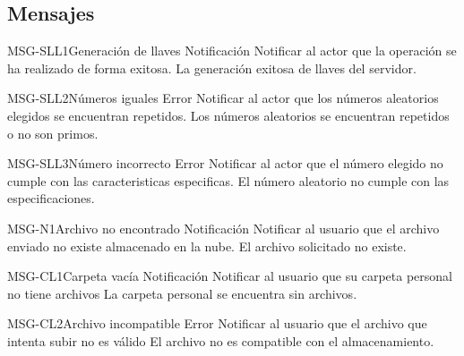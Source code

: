 \subsection{Mensajes}

\begin{Message}{MSG-SLL1}{Generación de llaves} 
	\MSGitem[Tipo: ] Notificación
	\MSGitem[Objetivo: ] Notificar al actor que la operación se ha realizado de forma exitosa.
	\MSGitem[Redacción: ] La generación exitosa de llaves del servidor.
	\MSGitem[Ejemplo: ] 
\end{Message}

\begin{Message}{MSG-SLL2}{Números iguales} 
	\MSGitem[Tipo: ] Error
	\MSGitem[Objetivo: ] Notificar al actor que los números aleatorios elegidos se encuentran repetidos.
	\MSGitem[Redacción: ] Los números aleatorios se encuentran repetidos o no son primos.
	\MSGitem[Ejemplo: ] 
\end{Message}

\begin{Message}{MSG-SLL3}{Número incorrecto} 
	\MSGitem[Tipo: ] Error
	\MSGitem[Objetivo: ] Notificar al actor que el número elegido no cumple con las caracteristicas especificas.
	\MSGitem[Redacción: ] El número aleatorio no cumple con las especificaciones.
	\MSGitem[Ejemplo: ] 
\end{Message}

\begin{Message}{MSG-N1}{Archivo no encontrado} 
	\MSGitem[Tipo: ] Notificación
	\MSGitem[Objetivo: ] Notificar al usuario que el archivo enviado no existe almacenado en la nube.
	\MSGitem[Redacción: ] El archivo solicitado no existe.
	\MSGitem[Ejemplo: ] 
\end{Message}

\begin{Message}{MSG-CL1}{Carpeta vacía} 
	\MSGitem[Tipo: ] Notificación
	\MSGitem[Objetivo: ] Notificar al usuario que su carpeta personal no tiene archivos
	\MSGitem[Redacción: ] La carpeta personal se encuentra sin archivos.
	\MSGitem[Ejemplo: ] 
\end{Message}

\begin{Message}{MSG-CL2}{Archivo incompatible} 
	\MSGitem[Tipo: ] Error
	\MSGitem[Objetivo: ] Notificar al usuario que el archivo que intenta subir no es válido
	\MSGitem[Redacción: ] El archivo no es compatible con el almacenamiento.
	\MSGitem[Ejemplo: ] 
\end{Message}

